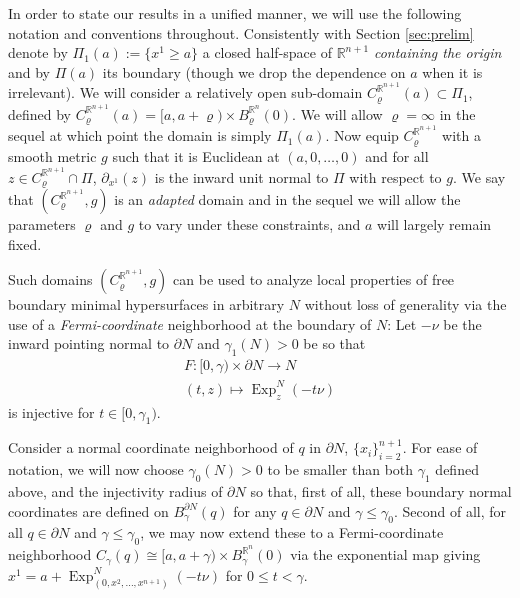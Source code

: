 \documentclass[10pt]{article}
\theoremstyle{definition}\newtheorem{definition}[thm]{Definition}
\numberwithin{equation}{section}
\newcommand{\R}{\mathbb{R}}\newcommand{\C}{\mathbb{C}}\newcommand{\N}{\mathbb{N}}
\begin{document}
        	 	In order to state our results in a unified manner, we will use the following notation and conventions throughout. Consistently with Section \ref{sec:prelim} denote by $\Pi_1(a):=\{x^1\geqslant a\}$ a closed half-space of $\R^{n+1}$ \emph{containing the origin} and by $\Pi(a)$ its boundary (though we drop the dependence on $a$ when it is irrelevant).  We will consider %
        	 	a relatively open sub-domain $C^{\R^{n+1}}_\varrho(a)\subset \Pi_1$,  %
        	 	defined by $C^{\R^{n+1}}_\varrho(a)=[a,a+\varrho)\times B^{\R^n}_\varrho (0)$. We will allow $\varrho=\infty$ in the sequel at which point the domain is simply $\Pi_1(a)$.  %
        	 	Now equip $C^{\R^{n+1}}_\varrho$ with a smooth metric $g$ such that it is Euclidean at $(a,0,\dots,0)$ and for all $z\in C^{\R^{n+1}}_\varrho\cap \Pi$, $\partial_{x^1}(z)$ is the inward unit normal to $\Pi$ with respect to $g$. We say that $(C^{\R^{n+1}}_\varrho,g)$ is an \emph{adapted} domain and in the sequel we will allow the parameters $\varrho$ and $g$ to vary under these constraints, and $a$ will largely remain fixed.   %
        	 	
        	 	
        	 	Such domains $(C^{\R^{n+1}}_\varrho,g)$ can be used to analyze local properties of free boundary minimal hypersurfaces in arbitrary $N$ without loss of generality via the use of
        	 	a \emph{Fermi-coordinate} neighborhood at the boundary of $N$: 
        	 	Let $-\nu$ be the inward pointing normal to $\partial N$ and $\gamma_1(N)>0$ be so that 
        	 	\begin{eqnarray*}
        	 		& F:[0,\gamma)\times \partial N \longrightarrow N&\\
        	 		&(t,z)\longmapsto \operatorname{Exp}^N_z (-t\nu)&
        	 	\end{eqnarray*} 
        	 	is injective for $t\in [0,\gamma_1)$. 
        	 	
        	 	Consider a normal coordinate neighborhood of $q$ in $\partial N$, $\{x_i\}_{i=2}^{n+1}$. For ease of notation, we will now choose $\gamma_0(N) >0$ to be smaller than both $\gamma_1$ defined above, and the injectivity radius of $\partial N$ so that, first of all, these boundary normal coordinates are defined on $B^{\partial N}_\gamma (q)$ for any $q\in \partial N$ and $\gamma \leqslant \gamma_0$. Second of all, for all $q\in \partial N$ and $\gamma\leqslant \gamma_0$, we may now extend these to a Fermi-coordinate neighborhood $C_{\gamma}(q) \cong [a,a+\gamma)\times B^{\R^n}_\gamma (0)$ via the exponential map giving $x^{1} = a+ \operatorname{Exp}^N_{(0,x^2,\dots,x^{n+1})} (-t\nu)$ for $0\leqslant t<\gamma$. 
        	 	
\end{document}
